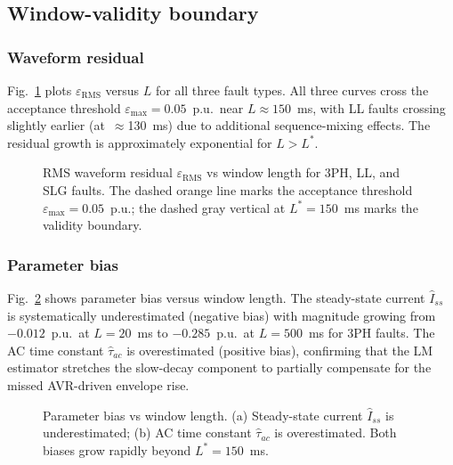 \documentclass[journal,twoside,letterpaper]{IEEEtran}
\begin{document}
\subsection{Window-validity boundary}

\subsubsection{Waveform residual}

Fig.~\ref{fig:rms_residual} plots $\varepsilon_{\mathrm{RMS}}$
versus $L$ for all three fault types.
All three curves cross the acceptance threshold
$\varepsilon_{\max} = 0.05$~p.u.\ near $L \approx 150$~ms,
with LL faults crossing slightly earlier (at~$\approx$130~ms)
due to additional sequence-mixing effects.
The residual growth is approximately exponential for
$L > L^\ast$.

\begin{figure}[!t]
  \centering
  
  \caption{RMS waveform residual $\varepsilon_{\mathrm{RMS}}$
    vs window length for 3PH, LL, and SLG faults.
    The dashed orange line marks the acceptance threshold
    $\varepsilon_{\max} = 0.05$~p.u.; the dashed gray
    vertical at $L^\ast = 150$~ms marks the validity
    boundary.}
  \label{fig:rms_residual}
\end{figure}

\subsubsection{Parameter bias}

Fig.~\ref{fig:param_bias} shows parameter bias versus window
length.
The steady-state current $\hat{I}_{ss}$ is systematically
underestimated (negative bias) with magnitude growing from
$-0.012$~p.u.\ at $L = 20$~ms to $-0.285$~p.u.\ at
$L = 500$~ms for 3PH faults.
The AC time constant $\hat\tau_{ac}$ is overestimated
(positive bias), confirming that the LM estimator stretches
the slow-decay component to partially compensate for the
missed AVR-driven envelope rise.

\begin{figure}[!t]
  \centering
  
  \caption{Parameter bias vs window length.
    (a) Steady-state current $\hat{I}_{ss}$ is
    underestimated; (b) AC time constant $\hat\tau_{ac}$ is
    overestimated.
    Both biases grow rapidly beyond $L^\ast = 150$~ms.}
  \label{fig:param_bias}
\end{figure}
\end{document}
